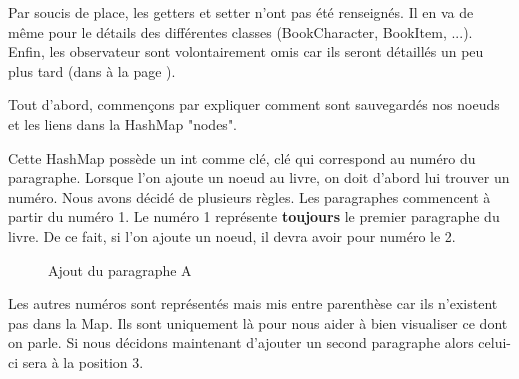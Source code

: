 			Par soucis de place, les getters et setter n'ont pas été renseignés. Il en va de même pour le détails des différentes classes (BookCharacter, BookItem, ...). Enfin, les observateur sont volontairement omis car ils seront détaillés un peu plus tard (dans  à la page \pageref{subsec:pattern_observer}).

			Tout d'abord, commençons par expliquer comment sont sauvegardés nos noeuds et les liens dans la HashMap "nodes".

			Cette HashMap possède un int comme clé, clé qui correspond au numéro du paragraphe. Lorsque l'on ajoute un noeud au livre, on doit d'abord lui trouver un numéro. Nous avons décidé de plusieurs règles. Les paragraphes commencent à partir du numéro 1. Le numéro 1 représente \textbf{toujours} le premier paragraphe du livre. De ce fait, si l'on ajoute un noeud, il devra avoir pour numéro le 2.

			\begin{figure}[H]
				\begin{center}
				\end{center}
				\caption{Ajout du paragraphe A}
			\end{figure}

			Les autres numéros sont représentés mais mis entre parenthèse car ils n'existent pas dans la Map. Ils sont uniquement là pour nous aider à bien visualiser ce dont on parle. Si nous décidons maintenant d'ajouter un second paragraphe alors celui-ci sera à la position 3.

